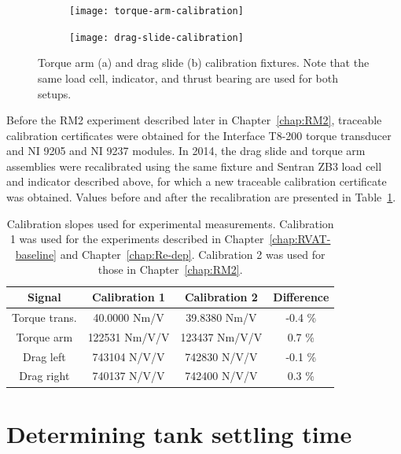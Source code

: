 \begin{figure}
    \centering
    \begin{subfigure}{0.9\textwidth}
        \texttt{[image: torque-arm-calibration]} \caption{}
    \end{subfigure}
    
    \begin{subfigure}{0.9\textwidth}
        \texttt{[image: drag-slide-calibration]}
        \caption{}
    \end{subfigure}
    
    \caption{Torque arm (a) and drag slide (b) calibration fixtures. Note that
        the same load cell, indicator, and thrust bearing are used for both setups.}
    
    \label{fig:calibration-fixtures}
\end{figure}

Before the RM2 experiment described later in Chapter~\ref{chap:RM2}, traceable
calibration certificates were obtained for the Interface T8-200 torque
transducer and NI 9205 and NI 9237 modules. In 2014, the drag slide and torque
arm assemblies were recalibrated using the same fixture and Sentran ZB3 load
cell and indicator described above, for which a new traceable calibration
certificate was obtained. Values before and after the recalibration are
presented in Table~\ref{tab:calibrations}.

\begin{table}
    \centering
\begin{tabular}{c|c|c|c}
    Signal & Calibration 1 & Calibration 2 & Difference \\ 
    \hline 
    Torque trans. & 40.0000 Nm/V & 39.8380 Nm/V & -0.4 \% \\ 
    Torque arm & 122531 Nm/V/V & 123437 Nm/V/V & 0.7 \% \\ 
    Drag left & 743104 N/V/V & 742830 N/V/V & -0.1 \% \\ 
    Drag right & 740137 N/V/V & 742400 N/V/V & 0.3 \% \\ 
\end{tabular}
    \caption{Calibration slopes used for experimental measurements. Calibration
        1 was used for the experiments described in Chapter~\ref{chap:RVAT-baseline}
        and Chapter~\ref{chap:Re-dep}. Calibration 2 was used for those in
        Chapter~\ref{chap:RM2}.}
    
    \label{tab:calibrations}
\end{table}


\section{Determining tank settling time}

